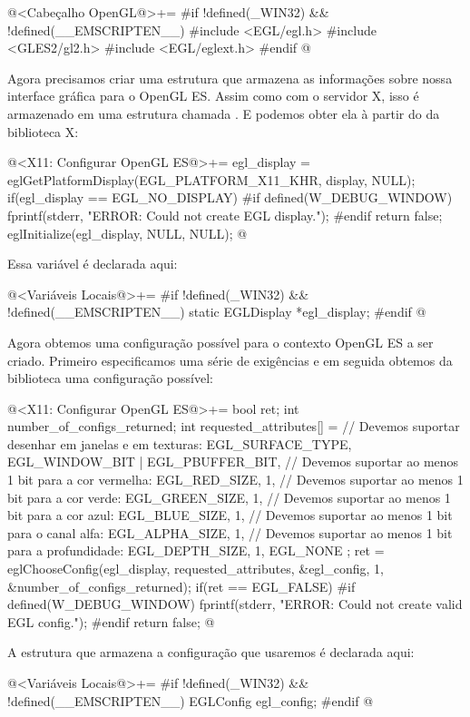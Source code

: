 \iniciocodigo
@<Cabeçalho OpenGL@>+=
#if !defined(_WIN32) && !defined(__EMSCRIPTEN__)
#include <EGL/egl.h>
#include <GLES2/gl2.h>
#include <EGL/eglext.h>
#endif
@
\fimcodigo

Agora precisamos criar uma estrutura que armazena as informações sobre
nossa interface gráfica para o OpenGL ES. Assim como com o servidor X,
isso é armazenado em uma estrutura chamada . E
podemos obter ela à partir do  da biblioteca X:

\iniciocodigo
@<X11: Configurar OpenGL ES@>+=
egl_display = eglGetPlatformDisplay(EGL_PLATFORM_X11_KHR, display,
                                    NULL);
if(egl_display == EGL_NO_DISPLAY){
#if defined(W_DEBUG_WINDOW)
  fprintf(stderr, "ERROR: Could not create EGL display.\n");
#endif
  return false;
}
eglInitialize(egl_display, NULL, NULL);
@
\fimcodigo

Essa variável é declarada aqui:

\iniciocodigo
@<Variáveis Locais@>+=
#if !defined(_WIN32) && !defined(__EMSCRIPTEN__)
static EGLDisplay *egl_display;
#endif
@
\fimcodigo

Agora obtemos uma configuração possível para o contexto OpenGL ES a
ser criado. Primeiro especificamos uma série de exigências e em
seguida obtemos da biblioteca uma configuração possível:

\iniciocodigo
@<X11: Configurar OpenGL ES@>+=
{
  bool ret;
  int number_of_configs_returned;
  int requested_attributes[] = {
    // Devemos suportar desenhar em janelas e em texturas:
    EGL_SURFACE_TYPE,  EGL_WINDOW_BIT | EGL_PBUFFER_BIT,
    // Devemos suportar ao menos 1 bit para a cor vermelha:
    EGL_RED_SIZE, 1,
    // Devemos suportar ao menos 1 bit para a cor verde:
    EGL_GREEN_SIZE, 1,
    // Devemos suportar ao menos 1 bit para a cor azul:
    EGL_BLUE_SIZE, 1,
    // Devemos suportar ao menos 1 bit para o canal alfa:
    EGL_ALPHA_SIZE, 1,
    // Devemos suportar ao menos 1 bit para a profundidade:
    EGL_DEPTH_SIZE, 1,
    EGL_NONE
  };
  ret = eglChooseConfig(egl_display, requested_attributes,
                        &egl_config, 1, &number_of_configs_returned);
  if(ret == EGL_FALSE){
#if defined(W_DEBUG_WINDOW)
    fprintf(stderr, "ERROR: Could not create valid EGL config.\n");
#endif
    return false;
  }
}
@
\fimcodigo

A estrutura que armazena a configuração que usaremos é declarada aqui:

\iniciocodigo
@<Variáveis Locais@>+=
#if !defined(_WIN32) && !defined(__EMSCRIPTEN__)
EGLConfig egl_config;
#endif
@
\fimcodigo


